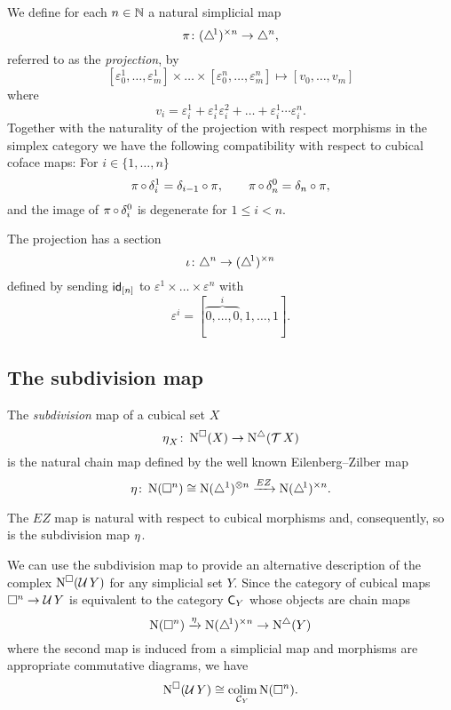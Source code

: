 We define for each $n \in \mathbb{N}$ a natural simplicial map
\[
\operatorname{\pi} \colon (\triangle^{\!1})^{\times n} \to \triangle^n,
\]
referred to as the \textit{projection}, by
\[
[\varepsilon_0^1, \dots, \varepsilon_m^1] \times \dots \times [ \varepsilon_0^n, \dots, \varepsilon_m^n] \mapsto
[v_0, \dots, v_m]
\]
where
\[
v_i = \varepsilon_i^1 + \varepsilon_i^1 \varepsilon_i^2 + \dots + \varepsilon_i^1 \dotsm \varepsilon_i^n.
\]
Together with the naturality of the projection with respect morphisms in the simplex category we have the following compatibility with respect to cubical coface maps:
For $i \in \{1,\dots,n\}$
\begin{equation} \label{e:projection cubical compatibility}
\operatorname{\pi} \circ \, \delta_i^1 = \delta_{i-1} \circ \pi, \qquad
\operatorname{\pi} \circ \, \delta_n^0 = \delta_{n} \circ \pi,
\end{equation}
and the image of $\operatorname{\pi} \circ \, \delta^0_i$ is degenerate for $1 \leq i < n$.

The projection has a section
\[
\operatorname{\iota} \colon \triangle^n \to (\triangle^{\!1})^{\times n}
\]
defined by sending $\mathsf{id}_{[n]}$ to $\varepsilon^1 \times \dots \times \varepsilon^n$ with
\[
\varepsilon^i = [\overbrace{0, \dots, 0}^{i}, 1, \dots, 1].
\]


\subsection{The subdivision map}

The \textit{subdivision} map of a cubical set $X$
\[
\operatorname{\eta}_X \colon \operatorname{N^{\square}}(X) \to \operatorname{N^{\triangle}}(\operatorname{\mathcal{T}} X)
\]
is the natural chain map defined by the well known Eilenberg--Zilber map
\[
\operatorname{\eta} \colon \operatorname{N}(\square^n) \cong \operatorname{N}(\triangle^1)^{\otimes n} \xrightarrow{EZ} \operatorname{N} (\triangle^{\!1})^{\times n}.
\]

The $EZ$ map is natural with respect to cubical morphisms and, consequently, so is the subdivision map $\operatorname{\eta}$.

We can use the subdivision map to provide an alternative description of the complex $\operatorname{N^{\square}}(\operatorname{\mathcal{U}} Y)$ for any simplicial set $Y$.
Since the category of cubical maps $\square^n \to \operatorname{\mathcal{U}} Y$ is equivalent to the category $\mathsf{C}_Y$ whose objects are chain maps
\[
\operatorname{N}(\square^n) \xrightarrow{\operatorname{\eta}} \operatorname{N} (\triangle^{\!1})^{\times n} \to \operatorname{N^{\triangle}}(Y)
\]
where the second map is induced from a simplicial map
and morphisms are appropriate commutative diagrams, we have
\begin{equation} \label{e:alternative description of NUY}
\operatorname{N^{\square}}(\operatorname{\mathcal{U}} Y) \cong \operatorname*{colim}_{\mathcal{C}_Y} \operatorname{N}(\square^n).
\end{equation}

